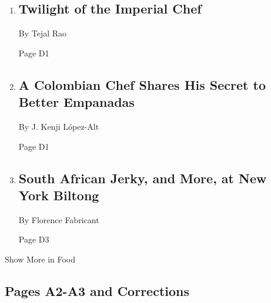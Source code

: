 \begin{enumerate}
\def\labelenumi{\arabic{enumi}.}
\item
  \href{/2020/08/04/dining/chef-restaurant-culture.html}{}

  \hypertarget{twilight-of-the-imperial-chef}{%
  \subsection{Twilight of the Imperial
  Chef}\label{twilight-of-the-imperial-chef}}

  By Tejal Rao

  Page D1
\item
  \href{/2020/08/04/dining/colombian-empanadas-carlos-gaviria.html}{}

  \hypertarget{a-colombian-chef-shares-his-secret-to-better-empanadas-1}{%
  \subsection{A Colombian Chef Shares His Secret to Better
  Empanadas}\label{a-colombian-chef-shares-his-secret-to-better-empanadas-1}}

  By J. Kenji López-Alt

  Page D1
\item
  \href{/2020/08/03/dining/new-york-biltong.html}{}

  \hypertarget{south-african-jerky-and-more-at-new-york-biltong}{%
  \subsection{South African Jerky, and More, at New York
  Biltong}\label{south-african-jerky-and-more-at-new-york-biltong}}

  By Florence Fabricant

  Page D3
\end{enumerate}

Show More in Food

\hypertarget{pages-a2-a3-and-corrections}{%
\subsection{Pages A2-A3 and
Corrections}\label{pages-a2-a3-and-corrections}}

